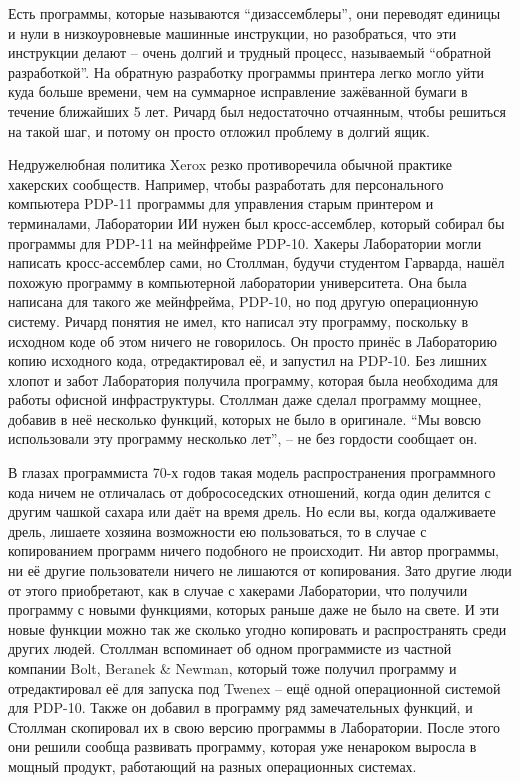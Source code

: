 Есть программы, которые называются \enquote{дизассемблеры}, они переводят единицы и нули в низкоуровневые машинные инструкции, но разобраться, что эти инструкции делают -- очень долгий и трудный процесс, называемый \enquote{обратной разработкой}. На обратную разработку программы принтера легко могло уйти куда больше времени, чем на суммарное исправление зажёванной бумаги в течение ближайших 5 лет. Ричард был недостаточно отчаянным, чтобы решиться на такой шаг, и потому он просто отложил проблему в долгий ящик.

Недружелюбная политика Xerox резко противоречила обычной практике хакерских сообществ. Например, чтобы разработать для персонального компьютера PDP-11 программы для управления старым принтером и терминалами, Лаборатории ИИ нужен был кросс-ассемблер, который собирал бы программы для PDP-11 на мейнфрейме PDP-10. Хакеры Лаборатории могли написать кросс-ассемблер сами, но Столлман, будучи студентом Гарварда, нашёл похожую программу в компьютерной лаборатории университета. Она была написана для такого же мейнфрейма, PDP-10, но под другую операционную систему. Ричард понятия не имел, кто написал эту программу, поскольку в исходном коде об этом ничего не говорилось. Он просто принёс в Лабораторию копию исходного кода, отредактировал её, и запустил на PDP-10. Без лишних хлопот и забот Лаборатория получила программу, которая была необходима для работы офисной инфраструктуры. Столлман даже сделал программу мощнее, добавив в неё несколько функций, которых не было в оригинале. \enquote{Мы вовсю использовали эту программу несколько лет}, -- не без гордости сообщает он.

В глазах программиста 70-х годов такая модель распространения программного кода ничем не отличалась от добрососедских отношений, когда один делится с другим чашкой сахара или даёт на время дрель. Но если вы, когда одалживаете дрель, лишаете хозяина возможности ею пользоваться, то в случае с копированием программ ничего подобного не происходит. Ни автор программы, ни её другие пользователи ничего не лишаются от копирования. Зато другие люди от этого приобретают, как в случае с хакерами Лаборатории, что получили программу с новыми функциями, которых раньше даже не было на свете. И эти новые функции можно так же сколько угодно копировать и распространять среди других людей. Столлман вспоминает об одном программисте из частной компании Bolt, Beranek \& Newman, который тоже получил программу и отредактировал её для запуска под Twenex -- ещё одной операционной системой для PDP-10. Также он добавил в программу ряд замечательных функций, и Столлман скопировал их в свою версию программы в Лаборатории. После этого они решили сообща развивать программу, которая уже ненароком выросла в мощный продукт, работающий на разных операционных системах.

